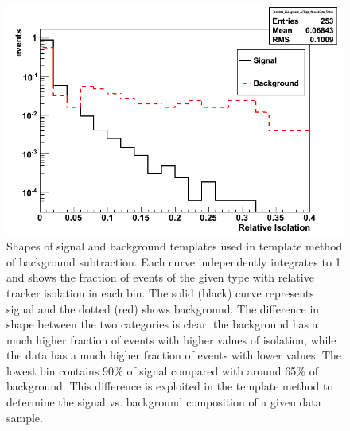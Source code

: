  \begin{figure}[htb]
  \begin{center}
    \includegraphics[width=360pt]{Figures/TemplateShapes-01Mar11-lines.png}
  \end{center}
  \caption[Shapes of signal and background templates used in 
    template method of background subtraction]{
    Shapes of signal and background templates 
    used in template method of background subtraction.
    Each curve independently integrates to 1 
    and shows the fraction of events of the given type 
    with relative tracker isolation in each bin.  
    The solid (black) curve represents signal 
    and the dotted (red) shows background.  
    The difference in shape between the two categories 
    is clear: 
    the background has a much higher fraction of events 
    with higher values of isolation, 
    while the data has a much higher fraction of events 
    with lower values.  
    The lowest bin contains 90\% of signal compared with 
    around 65\% of background.  
    This difference is exploited 
    in the template method 
    to determine the 
    signal vs. background composition of a given 
    data sample.  
  }
  \label{fig:TemplateShapes}
 \end{figure}

